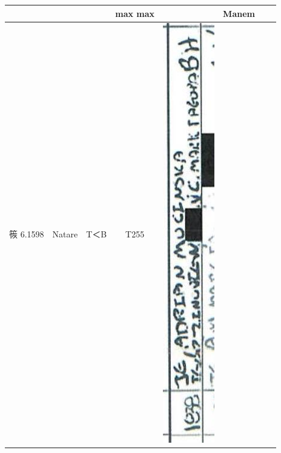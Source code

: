 \documentclass[10pt]{article}
\begin{document}
\begin{center}
\begin{tabular}{|c|c|c|c|c|c|c|c|}
 &  &  & max max &  & Manem &  \\
\hline
䈐 6.1598 & Natare & T＜B & T255 & \includegraphics[max width=\textwidth]{2025_02_27_dd68c3d38de88f0516d9g-122(1)}

\end{tabular}
\end{center}
\end{document}
